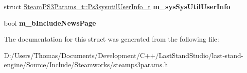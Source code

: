 \begin{DoxyCompactItemize}
\item 
\hypertarget{structSteamPS3Params__t_ae94f98ef9365fa79e8c2497765e3af95}{}struct \hyperlink{structSteamPS3Params__t_1_1Ps3sysutilUserInfo__t}{Steam\+P\+S3\+Params\+\_\+t\+::\+Ps3sysutil\+User\+Info\+\_\+t} {\bfseries m\+\_\+sys\+Sys\+Util\+User\+Info}\label{structSteamPS3Params__t_ae94f98ef9365fa79e8c2497765e3af95}

\item 
\hypertarget{structSteamPS3Params__t_a90d5216379054b840a7c1c75381e7a9b}{}bool {\bfseries m\+\_\+b\+Include\+News\+Page}\label{structSteamPS3Params__t_a90d5216379054b840a7c1c75381e7a9b}

\end{DoxyCompactItemize}


The documentation for this struct was generated from the following file\+:\begin{DoxyCompactItemize}
\item 
D\+:/\+Users/\+Thomas/\+Documents/\+Development/\+C++/\+Last\+Stand\+Studio/last-\/stand-\/engine/\+Source/\+Include/\+Steamworks/steamps3params.\+h\end{DoxyCompactItemize}
